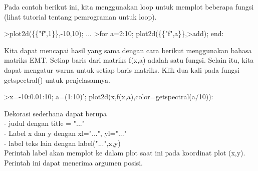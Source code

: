 \documentclass[12pt,arial,letterpaper]{book}
\begin{document}
\begin{eulernootebook}
\begin{eulercomment}
\begin{eulercomment}
\begin{eulernootebook}
\begin{eulercomment}
\begin{eulercomment}
\begin{eulercomment}
\begin{eulercomment}
\begin{eulercomment}
\begin{eulercomment}
\begin{eulercomment}
\begin{eulernotebook}
\begin{eulercomment}
\begin{eulercomment}
\begin{eulercomment}
\begin{eulercomment}
\begin{eulercomment}
Pada contoh berikut ini, kita menggunakan loop untuk memplot beberapa
fungsi (lihat tutorial tentang pemrograman untuk loop).
\end{eulercomment}
\begin{eulerprompt}
>plot2d(\{\{"f",1\}\},-10,10); ...
>for a=2:10; plot2d(\{\{"f",a\}\},>add); end:
\end{eulerprompt}
\begin{eulercomment}
Kita dapat mencapai hasil yang sama dengan cara berikut menggunakan
bahasa matriks EMT. Setiap baris dari matriks f(x,a) adalah satu
fungsi. Selain itu, kita dapat mengatur warna untuk setiap baris
matriks. Klik dua kali pada fungsi getspectral() untuk penjelasannya.
\end{eulercomment}
\begin{eulerprompt}
>x=-10:0.01:10; a=(1:10)'; plot2d(x,f(x,a),color=getspectral(a/10)):
\end{eulerprompt}
\begin{eulercomment}
Dekorasi sederhana dapat berupa\\
- judul dengan title = "..."\\
- Label x dan y dengan xl="...", yl="..."\\
- label teks lain dengan label("...",x,y)\\
Perintah label akan memplot ke dalam plot saat ini pada koordinat plot
(x,y). Perintah ini dapat menerima argumen posisi.


\end{eulercomment}
\end{eulercomment}
\end{eulercomment}
\end{eulercomment}
\end{eulercomment}
\end{eulernotebook}
\end{eulercomment}
\end{eulercomment}
\end{eulercomment}
\end{eulercomment}
\end{eulercomment}
\end{eulercomment}
\end{eulercomment}
\end{eulernootebook}
\end{eulercomment}
\end{eulercomment}
\end{eulernootebook}
\end{document}
